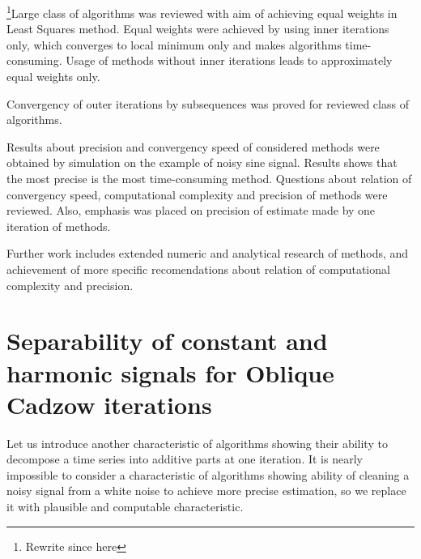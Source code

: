 \documentclass[sii]{ipart}
\begin{document}
\footnote{Rewrite since here}Large class of algorithms was reviewed with aim of achieving equal weights in Least Squares method. Equal weights were achieved by using inner iterations only, which converges to local minimum only and makes algorithms time-consuming. Usage of methods without inner iterations leads to approximately equal weights only.

Convergency of outer iterations by subsequences was proved for reviewed class of algorithms.

Results about precision and convergency speed of considered methods were obtained by simulation on the example of noisy sine signal. Results shows that the most precise is the most time-consuming method. Questions about relation of convergency speed, computational complexity and precision of methods were reviewed. Also, emphasis was placed on precision of estimate made by one iteration of methods.

Further work includes extended numeric and analytical research of methods, and achievement of more specific recomendations about relation of computational complexity and precision.

\appendix

\section{Separability of constant and harmonic signals for Oblique Cadzow iterations}
\label{sec:app}

Let us introduce another characteristic of algorithms showing their ability to decompose a time series into additive parts at one iteration. It is nearly impossible to consider a characteristic of algorithms showing ability of cleaning a noisy signal from a white noise to achieve more precise estimation, so we replace it with plausible and computable characteristic.
\end{document}
